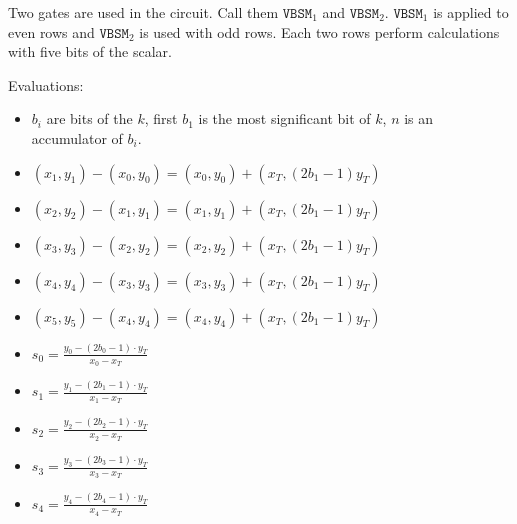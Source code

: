 Two gates are used in the circuit. 
Call them $\texttt{VBSM}_1$ and $\texttt{VBSM}_2$.
$\texttt{VBSM}_1$ is applied to even rows and $\texttt{VBSM}_2$ is used with odd rows. 
Each two rows perform calculations with five bits of the scalar.

Evaluations:
\begin{itemize}
	\item $b_i$ are bits of the $k$, first $b_1$ is the most significant bit of $k$, $n$ is an accumulator of $b_i$.
	\item $(x_1, y_1) - (x_0, y_0) = (x_0, y_0) + (x_T, (2b_1 - 1)y_T)$
	\item $(x_2, y_2) - (x_1, y_1) = (x_1, y_1) + (x_T, (2b_1 - 1)y_T)$
	\item $(x_3, y_3) - (x_2, y_2) = (x_2, y_2) + (x_T, (2b_1 - 1)y_T)$
	\item $(x_4, y_4) - (x_3, y_3) = (x_3, y_3) + (x_T, (2b_1 - 1)y_T)$
	\item $(x_5, y_5) - (x_4, y_4) = (x_4, y_4) + (x_T, (2b_1 - 1)y_T)$
	\item $s_0 = \frac{y_0 - (2b_0 - 1) \cdot y_T}{x_0 - x_T}$
	\item $s_1 = \frac{y_1 - (2b_1 - 1) \cdot y_T}{x_1 - x_T}$
	\item $s_2 = \frac{y_2 - (2b_2 - 1) \cdot y_T}{x_2 - x_T}$
	\item $s_3 = \frac{y_3 - (2b_3 - 1) \cdot y_T}{x_3 - x_T}$
	\item $s_4 = \frac{y_4 - (2b_4 - 1) \cdot y_T}{x_4 - x_T}$
\end{itemize}

